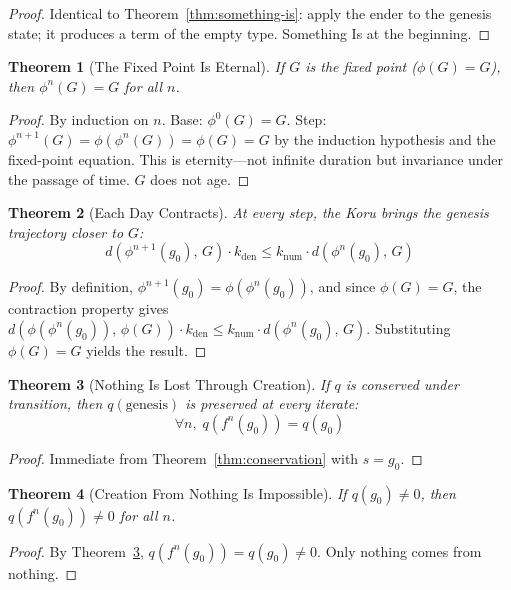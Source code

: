 \documentclass[12pt,a4paper]{article}
\newtheorem{theorem}{Theorem}[section]
\begin{document}
\begin{proof}
Identical to Theorem~\ref{thm:something-is}: apply the ender to the
genesis state; it produces a term of the empty type.
Something Is at the beginning.
\end{proof}

\begin{theorem}[The Fixed Point Is Eternal]\label{thm:eternal}
If $G$ is the fixed point ($\phi(G) = G$), then $\phi^n(G) = G$ for
all $n$.
\end{theorem}

\begin{proof}
By induction on $n$. Base: $\phi^0(G) = G$. Step:
$\phi^{n+1}(G) = \phi(\phi^n(G)) = \phi(G) = G$ by the induction
hypothesis and the fixed-point equation. This is eternity---not infinite
duration but invariance under the passage of time. $G$ does not age.
\end{proof}

\begin{theorem}[Each Day Contracts]\label{thm:contracts}
At every step, the Koru brings the genesis trajectory closer to $G$:
\[
  d(\phi^{n+1}(g_0),\, G) \cdot k_{\mathrm{den}} \leq
  k_{\mathrm{num}} \cdot d(\phi^n(g_0),\, G)
\]
\end{theorem}

\begin{proof}
By definition, $\phi^{n+1}(g_0) = \phi(\phi^n(g_0))$, and since
$\phi(G) = G$, the contraction property gives
$d(\phi(\phi^n(g_0)),\, \phi(G)) \cdot k_{\mathrm{den}}
\leq k_{\mathrm{num}} \cdot d(\phi^n(g_0),\, G)$.
Substituting $\phi(G) = G$ yields the result.
\end{proof}

\begin{theorem}[Nothing Is Lost Through Creation]\label{thm:nothing-lost}
If $q$ is conserved under transition, then $q(\text{genesis})$ is
preserved at every iterate:
\[
  \forall n,\; q(f^n(g_0)) = q(g_0)
\]
\end{theorem}

\begin{proof}
Immediate from Theorem~\ref{thm:conservation} with $s = g_0$.
\end{proof}

\begin{theorem}[Creation From Nothing Is Impossible]\label{thm:from-nothing}
If $q(g_0) \neq 0$, then $q(f^n(g_0)) \neq 0$ for all $n$.
\end{theorem}

\begin{proof}
By Theorem~\ref{thm:nothing-lost}, $q(f^n(g_0)) = q(g_0) \neq 0$.
Only nothing comes from nothing.
\end{proof}
\end{document}

